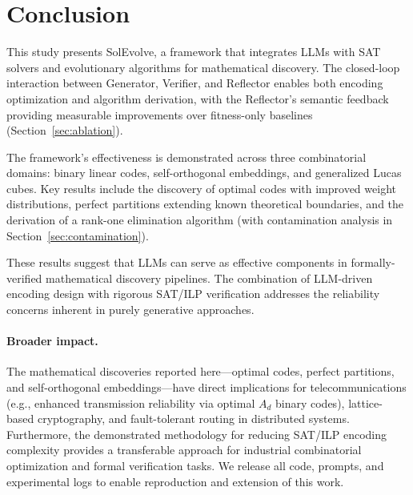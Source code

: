 \section{Conclusion}\label{ch:conclusion}

This study presents SolEvolve, a framework that integrates LLMs with SAT solvers and evolutionary algorithms for mathematical discovery. The closed-loop interaction between Generator, Verifier, and Reflector enables both encoding optimization and algorithm derivation, with the Reflector's semantic feedback providing measurable improvements over fitness-only baselines (Section~\ref{sec:ablation}).

The framework's effectiveness is demonstrated across three combinatorial domains: binary linear codes, self-orthogonal embeddings, and generalized Lucas cubes. Key results include the discovery of optimal codes with improved weight distributions, perfect partitions extending known theoretical boundaries, and the derivation of a rank-one elimination algorithm (with contamination analysis in Section~\ref{sec:contamination}).

These results suggest that LLMs can serve as effective components in formally-verified mathematical discovery pipelines. The combination of LLM-driven encoding design with rigorous SAT/ILP verification addresses the reliability concerns inherent in purely generative approaches. 

\paragraph{Broader impact.} The mathematical discoveries reported here---optimal codes, perfect partitions, and self-orthogonal embeddings---have direct implications for telecommunications (e.g., enhanced transmission reliability via optimal $A_d$ binary codes), lattice-based cryptography, and fault-tolerant routing in distributed systems. Furthermore, the demonstrated methodology for reducing SAT/ILP encoding complexity provides a transferable approach for industrial combinatorial optimization and formal verification tasks. We release all code, prompts, and experimental logs to enable reproduction and extension of this work.
